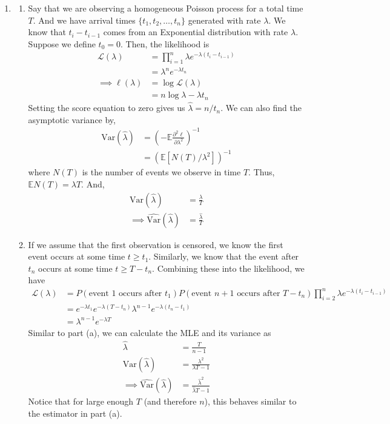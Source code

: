 \documentclass[11pt]{article}
\newcommand{\Var}{\text{Var}}
\newcommand{\E}{\mathbb{E}}
\begin{document}
\begin{enumerate}

\item
\begin{enumerate}
\item Say that we are observing a homogeneous Poisson process for a total time $T$. And we have arrival times $\{t_1, t_2, \dots, t_n\}$ generated with rate $\lambda$. We know that $t_i - t_{i-1}$ comes from an Exponential distribution with rate $\lambda$. Suppose we define $t_0 = 0$. Then, the likelihood is
\begin{align*}
	\mathcal{L}(\lambda) &= \prod_{i=1}^n \lambda e^{-\lambda (t_i - t_{i-1})} \\
	&= \lambda^n e^{-\lambda t_n} \\
	\implies \ell(\lambda) &= \log \mathcal{L}(\lambda) \\
	&= n \log \lambda - \lambda t_n
\end{align*}
Setting the score equation to zero gives us $\widehat{\lambda} = n / t_n$. We can also find the asymptotic variance by,
\begin{align*}
	\Var(\widehat{\lambda}) &= \left( - \E \frac{\partial^2 \ell}{\partial \lambda^2} \right)^{-1} \\
	&= \left( \E \left[ N(T) / \lambda^2 \right] \right)^{-1}
\end{align*}
where $N(T)$ is the number of events we observe in time $T$. Thus, $\E N(T) = \lambda T$. And,
\begin{align*}
	\Var(\widehat{\lambda}) &= \frac{\lambda}{T} \\
	\implies \widehat{\Var}(\widehat{\lambda}) &= \frac{\widehat{\lambda}}{T}
\end{align*}

\item If we assume that the first observation is censored, we know the first event occurs at some time $t \geq t_1$. Similarly, we know that the event after $t_n$ occurs at some time $t \geq T - t_n$. Combining these into the likelihood, we have
\begin{align*}
	\mathcal{L}(\lambda) &= P(\text{event 1 occurs after } t_1) P(\text{event } n + 1 \text{ occurs after } T - t_n) \prod_{i=2}^n \lambda e^{-\lambda (t_i - t_{i-1})} \\
	&= e^{-\lambda t_1} e^{-\lambda (T - t_n)} \lambda^{n-1} e^{-\lambda (t_n - t_1)} \\
	&= \lambda^{n-1} e^{-\lambda T}
\end{align*}
Similar to part (a), we can calculate the MLE and its variance as
\begin{align*}
	\widehat{\lambda} &= \frac{T}{n - 1} \\
	\Var(\widehat{\lambda}) &= \frac{\lambda^2}{\lambda T - 1} \\
	\implies \widehat{\Var}(\widehat{\lambda}) &= \frac{\widehat{\lambda}^2}{\widehat{\lambda} T - 1}
\end{align*}
Notice that for large enough $T$ (and therefore $n$), this behaves similar to the estimator in part (a).


\end{enumerate}
\end{enumerate}
\end{document}
